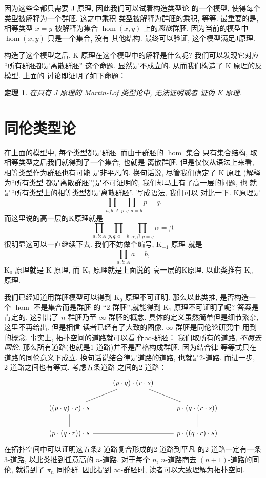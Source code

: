 \documentclass[UTF8]{ctexbook}
\theoremstyle{plain}
\newtheorem{theorem}{定理}[chapter]
\theoremstyle{definition}
\theoremstyle{remark}
\begin{document}
因为这些全都只需要 J 原理, 因此我们可以试着构造类型论
的一个模型, 使得每个类型被解释为一个群胚. 这之中乘积
类型被解释为群胚的乘积, 等等. 最重要的是, 相等类型
\(x = y\) 被解释为集合 \(\hom(x,y)\) 上的\emph{离散}群胚.
因为当前的模型中 \(\hom(x,y)\) 只是一个集合, 没有
其他结构. 最终可以验证, 这个模型满足J原理.

构造了这个模型之后, K 原理在这个模型中的解释是什么呢?
我们可以发现它对应 “所有群胚都是离散群胚” 这个命题.
显然是不成立的. 从而我们构造了 K 原理的反模型. 上面的
讨论即证明了如下命题：
\begin{theorem}
在只有 J 原理的 Martin-L\"of 类型论中, 无法证明或者
证伪 K 原理.
\end{theorem}

\section{同伦类型论}
在上面的模型中, 每个类型都是群胚. 而由于群胚的 \(\hom\) 集合
只有集合结构, 取相等类型之后我们就得到了一个集合, 也就是
离散群胚. 但是仅仅从语法上来看, 相等类型作为群胚也有可能
是非平凡的. 换句话说, 尽管我们确定了 K 原理 (解释为“所有类型
都是离散群胚”)是不可证明的, 我们却马上有了高一层的问题, 也
就是“所有类型上的相等类型都是离散群胚”. 写成语法, 我们可以
对比一下. K原理是
\[\prod_{a,b : A} \prod_{p,q:a=b} p = q.\]
而这里说的高一层的K原理就是
\[\prod_{a,b : A} \prod_{p,q:a=b} \prod_{\alpha,\beta:p=q} \alpha = \beta.\]
很明显这可以一直继续下去. 我们不妨做个编号, K\(_{-1}\) 原理
就是
\[\prod_{a,b : A} a = b,\]
K\(_0\) 原理就是 K 原理, 而 K\(_1\) 原理就是上面说的
高一层的K原理. 以此类推有 K\(_n\) 原理.

我们已经知道用群胚模型可以得到 K\(_0\) 原理不可证明.
那么以此类推, 是否构造一个 \(\hom\) 不是集合而是群胚
的 “2-群胚”,就能得到 K\(_1\) 原理不可证明了呢? 答案是
肯定的. 这引出了 \(n\)-群胚乃至 \(\infty\)-群胚的概念.
具体的定义虽然简单但是细节繁杂, 这里不再给出. 但是相信
读者已经有了大致的图像. \(\infty\)-群胚是同伦论研究中
用到的概念. 事实上, 拓扑空间的道路就可以看
作\(\infty\)-群胚： 我们取所有的道路, \emph{不商去同伦}.
那么所有道路(也就是1-道路)并不是严格构成群胚, 因为结合律
等等式只在道路的同伦意义下成立. 换句话说结合律是道路的道路,
也就是2-道路. 而进一步, 2-道路之间也有等式. 考虑五条道路
之间的2-道路：
\[\begin{tikzcd}
& {(p\cdot q)\cdot (r\cdot s)} \\
{((p\cdot q)\cdot r)\cdot s} && {p\cdot (q\cdot (r\cdot s))} \\
{(p\cdot (q\cdot r))\cdot s} && {p\cdot ((q\cdot r)\cdot s)}
\arrow[no head, from=2-1, to=1-2]
\arrow[no head, from=2-1, to=3-1]
\arrow[no head, from=3-1, to=3-3]
\arrow[no head, from=3-3, to=2-3]
\arrow[no head, from=2-3, to=1-2]
\end{tikzcd}\]
在拓扑空间中可以证明这五条2-道路复合形成的2-道路到平凡
的2-道路一定有一条3-道路, 以此类推到任意高的 \(n\)-道路.
对于每个 \(n\), \(n\)-道路商去 \((n+1)\)-道路的同伦,
就得到了 \(\pi_n\) 同伦群. 因此提到 \(\infty\)-群胚时,
读者可以大致理解为拓扑空间.
\end{document}
